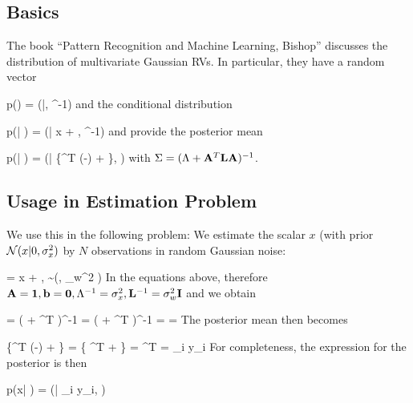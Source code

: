
\subsection{Basics}

The book ``Pattern Recognition and Machine Learning, Bishop'' discusses the distribution of multivariate Gaussian RVs. In particular, they have a random vector

\bee
p(\xbf) = \Nc(\xbf|\mu, \Lambda^{-1})
\eee
%
and the conditional distribution

\bee
p(\ybf | \xbf) = \Nc(\ybf | \Abf x + \bbf, \Lbf^{-1})
\eee
%
and provide the posterior mean

\bee
p(\xbf | \ybf) = \Nc(\xbf | \Sigma\{\Abf^T \Lbf (\ybf-\bbf) + \Lambda \mu\}, \Sigma)
\eee
%
with $\Sigma = (\Lambda + \mathbf{A}^T \mathbf{L} \mathbf{A})^{-1}$.

\subsection{Usage in Estimation Problem}

We use this in the following problem: We estimate the scalar $x$ (with prior $\mathcal{N}(x|0,\sigma_x^2)$ by $N$ observations in random Gaussian noise:

\bee
\ybf = x \onebf + \wbf, \qquad \wbf \sim \Nc(\zerobf, \sigma_w^2 \Ibf) 
\eee
%
In the equations above, therefore $\mathbf{A} = \mathbf{1}, \mathbf{b} = \mathbf{0}, \Lambda^{-1} = \sigma_x^2, \mathbf{L}^{-1} = \sigma_w^2 \mathbf{I}$ and we obtain

\bee
\Sigma = \left(  + \onebf^T  \Ibf \onebf \right)^{-1} = \left(  +  \onebf^T \onebf \right)^{-1} =  = 
\eee
%
The posterior mean then becomes

\bee
\Sigma\{\Abf^T \Lbf (\ybf-\bbf) + \Lambda \mu\} = \Sigma \left\{ \onebf^T \Ibf \ybf + \zerobf \right\} = \Sigma {} \onebf^T \ybf =  \sum_i y_i
\eee
%
For completeness, the expression for the posterior is then

\bee
p(x| \ybf) = \Nc\left(\ybf |  \sum_i y_i,  \right)
\eee
